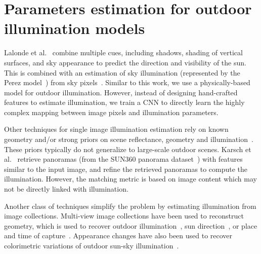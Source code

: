 \section{Parameters estimation for outdoor illumination models}


Lalonde et al.~\cite{lalonde-ijcv-12} combine multiple cues, including shadows, shading of vertical surfaces, and sky appearance to predict the direction and visibility of the sun. This is combined with an estimation of sky illumination (represented by the Perez model~\cite{perez1993allweather}) from sky pixels~\cite{lalonde-ijcv-10}. Similar to this work, we use a physically-based model for outdoor illumination. However, instead of designing hand-crafted features to estimate illumination, we train a CNN to directly learn the highly complex mapping between image pixels and illumination parameters. 

Other techniques for single image illumination estimation rely on known geometry and/or strong priors on scene reflectance, geometry and illumination~\cite{barron-pami-15,barron2013rgbd,lombardi2016reflectance}. These priors typically do not generalize to large-scale outdoor scenes. Karsch et al.~\cite{karsch2014automatic} retrieve panoramas (from the SUN360 panorama dataset~\cite{xiao-cvpr-12}) with features similar to the input image, and refine the retrieved panoramas to compute the illumination. However, the matching metric is based on image content which may not be directly linked with illumination. 

Another class of techniques simplify the problem by estimating illumination from image collections. Multi-view image collections have been used to reconstruct geometry, which is used to recover outdoor illumination~\cite{haber2009relighting,lalonde-3dv-14,shan2015visual,duchene2015multiview}, sun direction~\cite{wehrwein2015shadows}, or place and time of capture~\cite{hauagge2014outdoor}. Appearance changes have also been used to recover colorimetric variations of outdoor sun-sky illumination~\cite{sunkavalli2008color}. 





